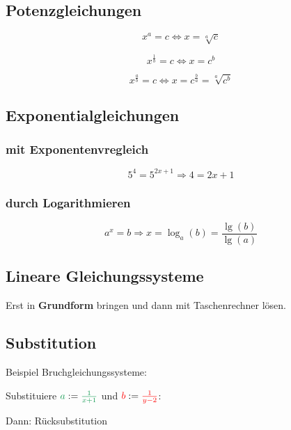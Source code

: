 \begin{multicols}{2}


\forceCB
\subsection*{Potenzgleichungen}

$$x^a=c \Leftrightarrow x=\sqrt[a]{c}$$

$$x^\frac1b=c \Leftrightarrow x=c^b$$




$$x^{\frac{a}b} = c \Leftrightarrow{}
x=c^{\frac{b}a} = \sqrt[a]{c^b}$$

\subsection*{Exponentialgleichungen}
\subsubsection*{mit Exponentenvregleich}

$$5^4 = 5^{2x+1} \Longrightarrow  4=2x+1$$

\subsubsection*{durch Logarithmieren}
$$a^x=b \Rightarrow{} x=\log_a(b) = \frac{\lg(b)}{\lg(a)}$$


\forceCB


\subsection*{Lineare Gleichungssysteme}
Erst in \textbf{Grundform} bringen und dann
mit Taschenrechner lösen.

\subsection*{Substitution}
Beispiel Bruchgleichungssysteme:

Substituiere
${\color{ForestGreen}a}:={\color{ForestGreen}\frac1{x+1}}$ und
${\color{red}b} : ={\color{red}\frac1{y-2}}$:


Dann: Rücksubstitution


\end{multicols}
